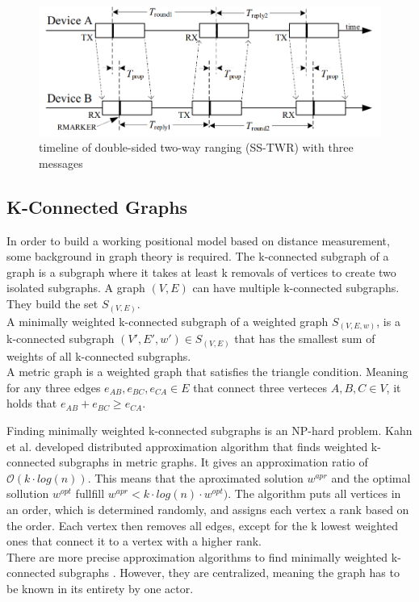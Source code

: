\begin{figure}[ht!]
\centering
\includegraphics[width=\linewidth]{graphics/schematics/TwoSidedRangingThreeMessages.PNG}
\caption{timeline of double-sided two-way ranging (SS-TWR) with three messages\cite{IEEE4z}}
\label{f:ds_twr_3}
\end{figure}


\subsection{K-Connected Graphs}
\label{ss:k_connected_explained}
In order to build a working positional model based on distance measurement, some background in graph theory is required.
The k-connected subgraph of a graph is a subgraph where it takes at least k removals of vertices to create two isolated subgraphs.
A graph $(V,E)$ can have multiple k-connected subgraphs.
They build the set $S_{(V,E)}$.\\
A minimally weighted k-connected subgraph of a weighted graph $S_{(V,E,w)}$, is a k-connected subgraph $(V',E',w') \in S_{(V,E)}$ that has the smallest sum of weights of all k-connected subgraphs.\\
A metric graph is a weighted graph that satisfies the triangle condition.
Meaning for any three edges $e_{AB},e_{BC},e_{CA} \in E$  that connect three verteces $A, B, C \in V$, it holds that $e_{AB} + e_{BC} \geq e_{CA}$.


Finding minimally weighted k-connected subgraphs is an NP-hard problem.
Kahn et al. \cite{khan2007simple} developed distributed approximation algorithm that finds weighted k-connected subgraphs in metric graphs.
It gives an approximation ratio of $\mathcal{O}(k\cdot log(n))$.
This means that the aproximated solution $w^{apr}$ and the optimal sollution $w^{opt}$ fullfill $w^{apr} < k\cdot log(n)\cdot w^{opt})$.
The algorithm puts all vertices in an order, which is determined randomly, and assigns each vertex a rank based on the order.
Each vertex then removes all edges, except for the k lowest weighted ones that connect it to a vertex with a higher rank.\\
There are more precise approximation algorithms to find minimally weighted k-connected subgraphs \cite{kortsarz2003approximating, kortsarz2004approximation}. However, they are centralized, meaning the graph has to be known in its entirety by one actor.



